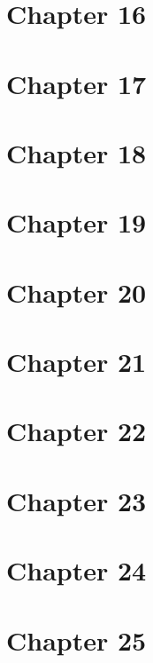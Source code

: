 \documentclass[
]{krantz}
\begin{document}
\hypertarget{problem-answers-chapter-16}{%
\section{Chapter 16}\label{problem-answers-chapter-16}}

\hypertarget{problem-answers-chapter-17}{%
\section{Chapter 17}\label{problem-answers-chapter-17}}

\hypertarget{problem-answers-chapter-18}{%
\section{Chapter 18}\label{problem-answers-chapter-18}}

\hypertarget{problem-answers-chapter-19}{%
\section{Chapter 19}\label{problem-answers-chapter-19}}

\hypertarget{problem-answers-chapter-20}{%
\section{Chapter 20}\label{problem-answers-chapter-20}}

\hypertarget{problem-answers-chapter-21}{%
\section{Chapter 21}\label{problem-answers-chapter-21}}

\hypertarget{problem-answers-chapter-22}{%
\section{Chapter 22}\label{problem-answers-chapter-22}}

\hypertarget{problem-answers-chapter-23}{%
\section{Chapter 23}\label{problem-answers-chapter-23}}

\hypertarget{problem-answers-chapter-24}{%
\section{Chapter 24}\label{problem-answers-chapter-24}}

\hypertarget{problem-answers-chapter-25}{%
\section{Chapter 25}\label{problem-answers-chapter-25}}

  

\backmatter
\printindex
\end{document}
